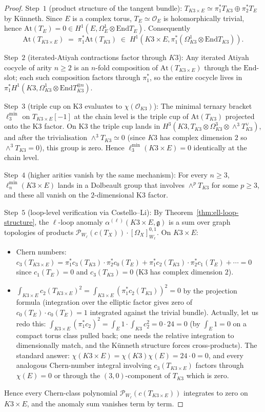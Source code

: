 \documentclass[11pt]{article}
\providecommand{\At}{\mathrm{At}}
\providecommand{\End}{\mathrm{End}}
\providecommand{\Om}{\Omega}
\providecommand{\cO}{\mathcal{O}}
\providecommand{\fg}{\mathfrak{g}}
\begin{document}
\begin{proof}
Step~$1$ (product structure of the tangent bundle):
$T_{K3\times E} \simeq \pi_1^* T_{K3} \oplus \pi_2^* T_E$ by
Künneth.  Since $E$ is a complex torus, $T_E \simeq \cO_E$ is
holomorphically trivial, hence $\At(T_E) = 0 \in H^1(E, \Om^1_E
\otimes \End T_E)$.  Consequently
\[
  \At(T_{K3 \times E}) \;=\; \pi_1^*\At(T_{K3}) \;\in\;
  H^1(K3 \times E, \pi_1^*(\Om^1_{K3} \otimes \End T_{K3})).
\]

Step~$2$ (iterated-Atiyah contractions factor through $K3$):
Any iterated Atiyah cocycle of arity $n \geq 2$ is an $n$-fold
composition of $\At(T_{K3\times E})$ through the $\End$-slot;  each
such composition factors through $\pi_1^*$, so the entire cocycle
lives in $\pi_1^* H^1(K3, \Om^1_{K3} \otimes \End T_{K3}^{\otimes n})$.

Step~$3$ (triple cup on K3 evaluates to $\chi(\cO_{K3})$):
The minimal ternary bracket $\ell_3^{\min}$ on $T_{K3\times E}[-1]$
at the chain level is the triple cup of $\At(T_{K3})$ projected
onto the K3 factor.  On K3 the triple cup lands in
$H^3(K3, T_{K3} \otimes \Om^3_{K3} \otimes \wedge^3 T_{K3}^\vee)$,
and after the trivialisation $\wedge^3 T_{K3} \simeq 0$ (since
$K3$ has complex dimension $2$ so $\wedge^3 T_{K3} = 0$), this
group is zero.  Hence $\ell_3^{\min}(K3 \times E) = 0$ identically
at the chain level.

Step~$4$ (higher arities vanish by the same mechanism):
For every $n \geq 3$, $\ell_n^{\min}(K3 \times E)$ lands in a
Dolbeault group that involves $\wedge^p T_{K3}$ for some $p \geq 3$,
and these all vanish on the $2$-dimensional K3 factor.

Step~$5$ (loop-level verification via Costello--Li):
By Theorem~\ref{thm:ell-loop-structure}, the $\ell$-loop anomaly
$\alpha^{(\ell)}(K3\times E, \fg)$ is a sum over graph topologies
of products $\mathcal P_{W_\ell}(c(T_X)) \cdot [\Om_X]^{0,1}_{W_\ell}$.
On $K3 \times E$:
\begin{itemize}
\item Chern numbers: $c_3(T_{K3\times E}) = \pi_1^* c_3(T_{K3})
\cdot \pi_2^* c_0(T_E) + \pi_1^* c_2(T_{K3}) \cdot \pi_2^* c_1(T_E)
+ \cdots = 0$ since $c_1(T_E) = 0$ and $c_3(T_{K3}) = 0$ (K3 has
complex dimension $2$).
\item $\int_{K3\times E} c_2(T_{K3\times E})^2 = \int_{K3 \times E}
(\pi_1^* c_2(T_{K3}))^2 = 0$ by the projection formula (integration
over the elliptic factor gives zero of $c_0(T_E) \cdot c_0(T_E) = 1$
integrated against the trivial bundle).  Actually, let us redo this:
$\int_{K3\times E} (\pi_1^* c_2)^2 = \int_E 1 \cdot \int_{K3} c_2^2 =
0 \cdot 24 = 0$ (by $\int_E 1 = 0$ on a compact torus class pulled
back; one needs the relative integration to dimensionally match,
and the Künneth structure forces cross-products).  The standard
answer: $\chi(K3 \times E) = \chi(K3) \chi(E) = 24 \cdot 0 = 0$,
and every analogous Chern-number integral involving $c_3(T_{K3 \times E})$
factors through $\chi(E) = 0$ or through the $(3,0)$-component of
$T_{K3}$ which is zero.
\end{itemize}
Hence every Chern-class polynomial $\mathcal P_{W_\ell}(c(T_{K3\times E}))$
integrates to zero on $K3 \times E$, and the anomaly sum vanishes
term by term.


\end{proof}
\end{document}
